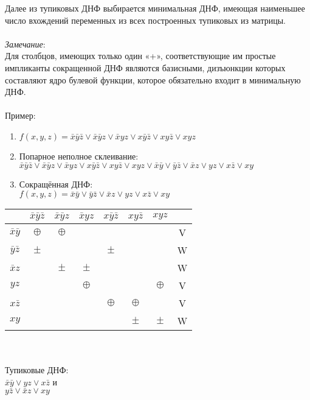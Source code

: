 \documentclass[a4paper, 12pt]{report}
\begin{document}
Далее из тупиковых ДНФ выбирается минимальная ДНФ, имеющая наименьшее число вхождений переменных из всех построенных тупиковых из матрицы.\\\\
\textit{Замечание}:\\
Для столбцов, имеющих только один «+», соответствующие им простые импликанты сокращенной ДНФ являются базисными, дизъюнкции которых составляют ядро булевой функции, которое обязательно входит в минимальную ДНФ.\\\\
Пример:
\begin{enumerate}
	\item $f(x, y, z) = \bar x \bar y \bar z \vee \bar x \bar y z \vee \bar x y z \vee x \bar y \bar z \vee x y \bar z \vee x y z$
	\item Попарное неполное склеивание:\\
	$\bar x \bar y \bar z \vee \bar x \bar y z \vee \bar x y z \vee x \bar y \bar z \vee x y \bar z \vee x y z \vee \bar x \bar y \vee \bar y \bar z \vee \bar x z \vee y z \vee x \bar z \vee x y$\\
	\item Сокращённая ДНФ:\\
	$f(x, y, z) = \bar x \bar y \vee \bar y \bar z \vee \bar x z \vee y z \vee x \bar z \vee x y$
\end{enumerate}
\begin{tabular}{|c|c|c|c|c|c|c|c|}
	\hline
	& $\bar x \bar y \bar z$ & $\bar x \bar y z$ & $\bar x y z$ & $x \bar y \bar z$ & $x y \bar z$ & $x y z$ &\\
	\hline
	$\bar x \bar y$ & $\oplus$&$\oplus$& & & & & V\\
	\hline
	$\bar y \bar z$ & $\pm$ &  &  & $\pm$ &  &  & W\\
	\hline
	$\bar x z$ &  & $\pm$ & $\pm$ &  &  &  & W\\ 
	\hline
	$ y z$ &  &  & $\oplus$ &  &  & $\oplus$ & V\\
	\hline
	$x \bar z$ &  &  &  & $\oplus$ & $\oplus$ &  & V\\
	\hline
	$x y$ &  &  &  &  & $\pm$ &  $\pm$ & W\\
	\hline
\end{tabular}\\\\
Тупиковые ДНФ:\\
$\bar x \bar y \vee y z \vee x \bar z$ и\\
$y \bar z \vee \bar x z \vee x y$
\end{document}
